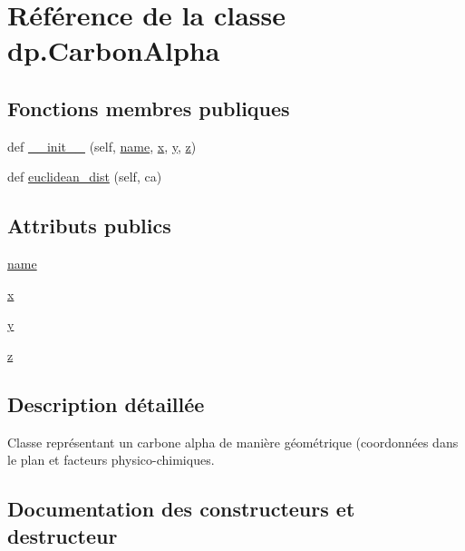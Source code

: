 \hypertarget{classdp_1_1CarbonAlpha}{}\section{Référence de la classe dp.\+Carbon\+Alpha}
\label{classdp_1_1CarbonAlpha}
\subsection*{Fonctions membres publiques}
\begin{DoxyCompactItemize}
\item 
def \hyperlink{classdp_1_1CarbonAlpha_ac363030d226b1f8485a79f2876d0571c}{\+\_\+\+\_\+init\+\_\+\+\_\+} (self, \hyperlink{classdp_1_1CarbonAlpha_a8ebe56e2818c231370b3f8ae8b4b76f9}{name}, \hyperlink{classdp_1_1CarbonAlpha_a95a4d1d29a88ffe044ca571770fdb7c9}{x}, \hyperlink{classdp_1_1CarbonAlpha_ac196434c1abedb418ab1a7e90bda987c}{y}, \hyperlink{classdp_1_1CarbonAlpha_a903ad8e7e02419f1537a2f59dbf62147}{z})
\item 
def \hyperlink{classdp_1_1CarbonAlpha_a0bf3e9d4d09558d9a9f3de2e2068e0f9}{euclidean\+\_\+dist} (self, ca)
\end{DoxyCompactItemize}
\subsection*{Attributs publics}
\begin{DoxyCompactItemize}
\item 
\hyperlink{classdp_1_1CarbonAlpha_a8ebe56e2818c231370b3f8ae8b4b76f9}{name}
\item 
\hyperlink{classdp_1_1CarbonAlpha_a95a4d1d29a88ffe044ca571770fdb7c9}{x}
\item 
\hyperlink{classdp_1_1CarbonAlpha_ac196434c1abedb418ab1a7e90bda987c}{y}
\item 
\hyperlink{classdp_1_1CarbonAlpha_a903ad8e7e02419f1537a2f59dbf62147}{z}
\end{DoxyCompactItemize}


\subsection{Description détaillée}
\begin{DoxyVerb}Classe représentant un carbone alpha de manière géométrique
(coordonnées dans le plan et facteurs physico-chimiques.\end{DoxyVerb}
 

\subsection{Documentation des constructeurs et destructeur}
